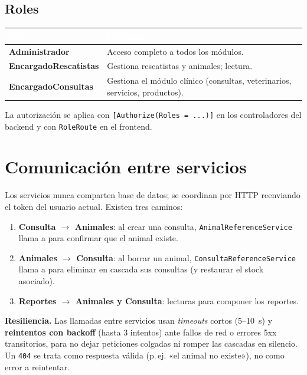 \documentclass[11pt,a4paper]{article}
\begin{document}
\subsection{Roles}
\begin{center}
\begin{tabular}{>{\bfseries}p{4.2cm} p{9.5cm}}
\toprule
\rowcolor{moss}\textcolor{white}{\textbf{Rol}} & \textcolor{white}{\textbf{Permisos}} \\
\midrule
Administrador        & Acceso completo a todos los módulos. \\
EncargadoRescatistas & Gestiona rescatistas y animales; lectura. \\
EncargadoConsultas   & Gestiona el módulo clínico (consultas, veterinarios, servicios, productos). \\
\bottomrule
\end{tabular}
\end{center}
\noindent
La autorización se aplica con \texttt{[Authorize(Roles = ...)]} en los
controladores del backend y con \texttt{RoleRoute} en el frontend.

\section{Comunicación entre servicios}

Los servicios nunca comparten base de datos; se coordinan por HTTP reenviando el
token del usuario actual. Existen tres caminos:

\begin{enumerate}[leftmargin=1.6em]
  \item \textbf{Consulta $\rightarrow$ Animales}: al crear una consulta,
        \texttt{AnimalReferenceService} llama a 
        para confirmar que el animal existe.
  \item \textbf{Animales $\rightarrow$ Consulta}: al borrar un animal,
        \texttt{ConsultaReferenceService} llama a
         para eliminar en cascada sus
        consultas (y restaurar el stock asociado).
  \item \textbf{Reportes $\rightarrow$ Animales y Consulta}: lecturas para componer
        los reportes.
\end{enumerate}

\begin{nota}
\textbf{Resiliencia.} Las llamadas entre servicios usan \emph{timeouts} cortos
(5--10~s) y \textbf{reintentos con backoff} (hasta 3 intentos) ante fallos de red o
errores 5xx transitorios, para no dejar peticiones colgadas ni romper las cascadas
en silencio. Un \texttt{404} se trata como respuesta válida (p.\,ej. «el animal no
existe»), no como error a reintentar.
\end{nota}
\end{document}
